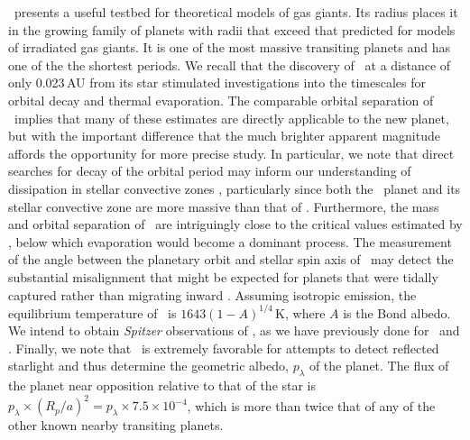 \tresThree\ presents a useful testbed for theoretical models of gas giants.
Its radius places it in the growing family of planets with radii that exceed that predicted for models of irradiated gas giants. 
It is one of the most massive transiting planets and has one of the the shortest periods.
We recall that the discovery of \ogletrFSb\ at a distance of only 0.023\,AU from its star stimulated investigations into the timescales for orbital decay and thermal evaporation. 
The comparable orbital separation of \tresThree\ implies that many of these estimates are directly applicable to the new planet, but with the important difference that the much brighter apparent magnitude affords the opportunity for more precise study.
In particular, we note that direct searches for decay of the orbital period may inform our understanding of dissipation in stellar convective zones \citep{Sasselov:apj:2003a}, particularly since both the \tresThree\ planet and its stellar convective zone are more massive than that of \ogletrFSb.
Furthermore, the mass and orbital separation of \tresThree\ are intriguingly close to the critical values estimated by \citet{Baraffe_Selsis_Chabrier:aa:2004a}, below which evaporation would become a dominant process.
The measurement of the angle between the planetary orbit and stellar spin axis of \tresThree\ may detect the substantial misalignment that might be expected for planets that were tidally captured rather than migrating inward \citep{Gaudi_Winn:apj:2007a}.
Assuming isotropic emission, the equilibrium temperature of \tresThree\ is $1643(1-A)^{1/4}$\,K, where $A$ is the Bond albedo. 
We intend to obtain {\it Spitzer} observations of \tresThree, as we have previously done for \tresOne\ and \tresTwo.
Finally, we note that \tresThree\ is extremely favorable for attempts to detect reflected starlight \citep{Charbonneau_Noyes_Korzennik:apjl:1999a, Leigh_Collier-Cameron_Udry:mnras:2003a, Rowe_Matthews_Seager:apj:2006a} and thus determine the geometric albedo, $p_{\lambda}$ of the planet.
The flux of the planet near opposition relative to that of the star is $p_{\lambda} \times (R_p / a)^2 = p_{\lambda} \times 7.5 \times 10^{-4}$, which is more than twice that of any of the other known nearby transiting planets.

